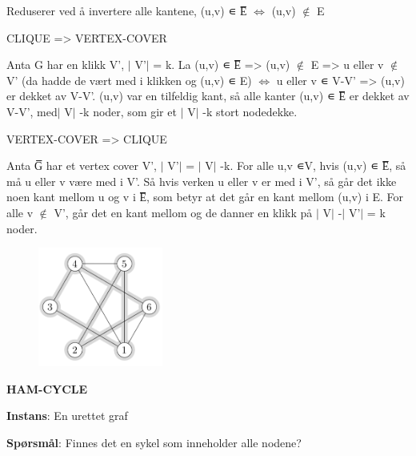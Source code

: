\documentclass[12pt]{report}
\begin{document}
Reduserer ved å invertere alle kantene, (u,v) ∊ E̅̅ $ \Leftrightarrow $  (u,v) $ \notin $  E\par

CLIQUE => VERTEX-COVER\par

Anta G har en klikk V’, $ \vert $ V’$ \vert $  = k. La (u,v) ∊ E̅̅ => (u,v) $ \notin $  E => u eller v $ \notin $  V’ (da hadde de vært med i klikken og (u,v) ∊ E) $ \Leftrightarrow $  u eller v ∊ V-V’ => (u,v) er dekket av V-V’. (u,v) var en tilfeldig kant, så alle kanter (u,v) ∊ E̅̅ er dekket av V-V’, med$ \vert $ V$ \vert $ -k noder, som gir et $ \vert $ V$ \vert $ -k stort nodedekke. \par

VERTEX-COVER => CLIQUE\par

Anta G̅̅ har et vertex cover V’, $ \vert $ V’$ \vert $  = $ \vert $ V$ \vert $ -k. For alle u,v ∊V, hvis (u,v) ∊ E̅̅, så må u eller v være med i V’. Så hvis verken u eller v er med i V’, så går det ikke noen kant mellom u og v i E̅̅, som betyr at det går en kant mellom (u,v) i E. For alle v $ \notin $  V’, går det en kant mellom og de danner en klikk på $ \vert $ V$ \vert $ -$ \vert $ V’$ \vert $  = k noder. \par


\vspace{\baselineskip}



\begin{figure}[H]
\advance\leftskip 5.18in		\includegraphics[width=1.62in,height=1.54in]{./media/image163.png}
\end{figure}



\textbf{HAM-CYCLE}\par

\textbf{Instans}: En urettet graf\par

\textbf{Spørsmål}: Finnes det en sykel som inneholder alle nodene?\par
\end{document}
